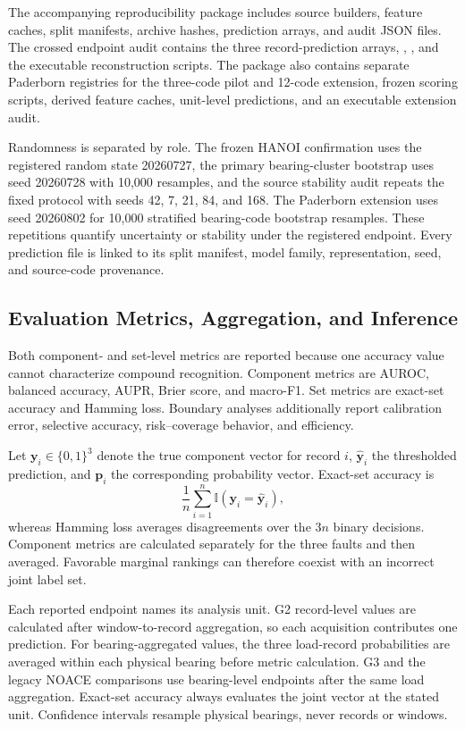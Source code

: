 \documentclass[machines,article,submit,oneauthor,pdftex]{Definitions/mdpi}
\begin{document}
The accompanying reproducibility package includes source builders, feature caches, split manifests, archive hashes, prediction arrays, and audit JSON files. The crossed endpoint audit contains the three record-prediction arrays, \texttt{}, \texttt{}, and the executable reconstruction scripts. The package also contains separate Paderborn registries for the three-code pilot and 12-code extension, frozen scoring scripts, derived feature caches, unit-level predictions, and an executable extension audit.

Randomness is separated by role. The frozen HANOI confirmation uses the registered random state 20260727, the primary bearing-cluster bootstrap uses seed 20260728 with 10,000 resamples, and the source stability audit repeats the fixed protocol with seeds 42, 7, 21, 84, and 168. The Paderborn extension uses seed 20260802 for 10,000 stratified bearing-code bootstrap resamples. These repetitions quantify uncertainty or stability under the registered endpoint. Every prediction file is linked to its split manifest, model family, representation, seed, and source-code provenance.

\subsection{Evaluation Metrics, Aggregation, and Inference}

Both component- and set-level metrics are reported because one accuracy value cannot characterize compound recognition. Component metrics are AUROC, balanced accuracy, AUPR, Brier score, and macro-F1. Set metrics are exact-set accuracy and Hamming loss. Boundary analyses additionally report calibration error, selective accuracy, risk--coverage behavior, and efficiency.

Let $\mathbf{y}_i\in\{0,1\}^{3}$ denote the true component vector for record $i$, $\hat{\mathbf{y}}_i$ the thresholded prediction, and $\mathbf{p}_i$ the corresponding probability vector. Exact-set accuracy is
\[
\frac{1}{n}\sum_{i=1}^{n}\mathbb{I}\!\left(\mathbf{y}_i=\hat{\mathbf{y}}_i\right),
\]
whereas Hamming loss averages disagreements over the $3n$ binary decisions. Component metrics are calculated separately for the three faults and then averaged. Favorable marginal rankings can therefore coexist with an incorrect joint label set.

Each reported endpoint names its analysis unit. G2 record-level values are calculated after window-to-record aggregation, so each acquisition contributes one prediction. For bearing-aggregated values, the three load-record probabilities are averaged within each physical bearing before metric calculation. G3 and the legacy NOACE comparisons use bearing-level endpoints after the same load aggregation. Exact-set accuracy always evaluates the joint vector at the stated unit. Confidence intervals resample physical bearings, never records or windows.
\end{document}
